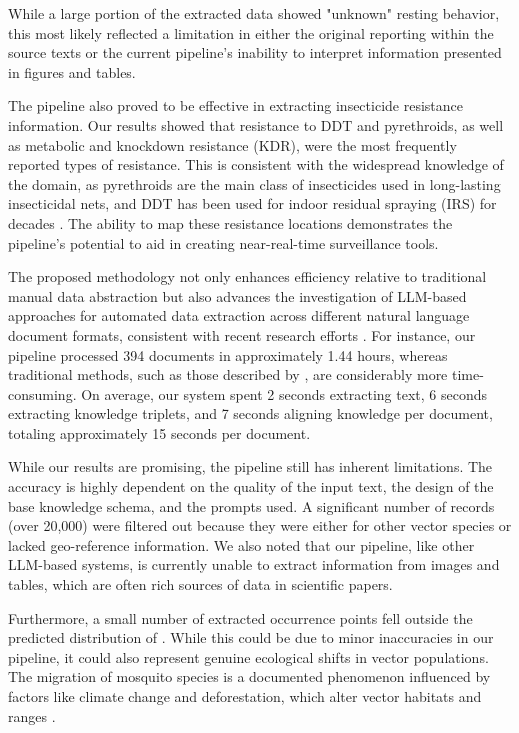 \documentclass{article}
\begin{document}
While a large portion of the extracted data showed "unknown" resting behavior, this most likely reflected a limitation in either the original reporting within the source texts or the current pipeline's inability to interpret information presented in figures and tables.
\par 
The pipeline also proved to be effective in extracting insecticide resistance information. 
Our results showed that resistance to DDT and pyrethroids, as well as metabolic and knockdown resistance (KDR), were the most frequently reported types of resistance. 
This is consistent with the widespread knowledge of the domain, as pyrethroids are the main class of insecticides used in long-lasting insecticidal nets, and DDT has been used for indoor residual spraying (IRS) for decades \citep{2023.HO.DOI, 2017.KG.RTG, 2020.NA.IOA}. 
The ability to map these resistance locations demonstrates the pipeline's potential to aid in creating near-real-time surveillance tools.

\par 
The proposed methodology not only enhances efficiency relative to traditional manual data abstraction but also
 advances the investigation of LLM-based approaches for automated data extraction across different natural language 
 document formats, consistent with recent research efforts \citep{2025.DE.APF, 2024.AL.EIC, 
 2025.SI.DAE, 2024.LU.ANA}. For instance, our pipeline processed 394 documents in approximately 1.44 hours, 
 whereas traditional methods, such as those described by \citep{2016.NC.AGB}, are considerably more time-consuming. 
On average, our system spent 2 seconds extracting text, 6 seconds extracting knowledge triplets, and 7 seconds 
aligning knowledge per document, totaling approximately 15 seconds per document.
\par
While our results are promising, the pipeline still has inherent limitations. 
The accuracy is highly dependent on the quality of the input text, the design of the base knowledge schema, and 
the prompts used. A significant number of records (over 20,000) were filtered out because they were either for 
other vector species or lacked geo-reference information. We also noted that our pipeline, like other LLM-based 
systems, is currently unable to extract information from images and tables, which are often rich sources of data 
in scientific papers.
\par
Furthermore, a small number of extracted occurrence points fell outside the predicted distribution of 
\citep{2012.ME.AGM}. While this could be due to minor inaccuracies in our pipeline, it could also represent 
genuine ecological shifts in vector populations. The migration of mosquito species is a documented phenomenon 
influenced by factors like climate change and deforestation, which alter vector habitats and ranges 
\citep{2024.EA.IAC, 2025.GR.STI}.
\end{document}
